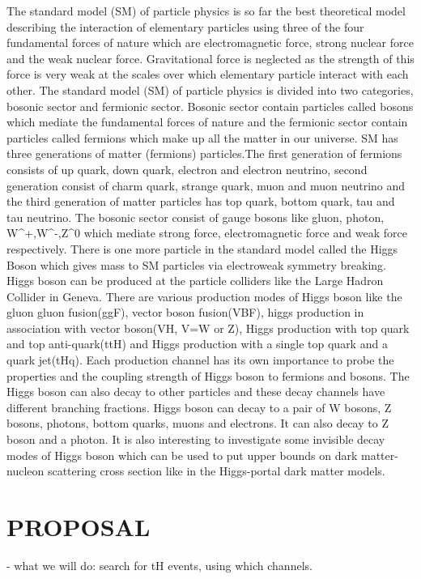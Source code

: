\documentclass[final,3p]{CSP}
\begin{document}
The standard model (SM) of particle physics is so far the best theoretical model describing the interaction of elementary particles using three of the four fundamental forces of nature which are electromagnetic force, strong nuclear force and the weak nuclear force. Gravitational force is neglected as the strength of this force is very weak at the scales over which elementary particle interact with each other. The standard model (SM) of particle physics is divided into two categories, bosonic sector and fermionic sector. Bosonic sector contain particles called bosons which mediate the fundamental forces of nature and the fermionic sector contain particles called fermions which make up all the matter in our universe. SM has three generations of matter (fermions) particles.The first generation of fermions consists of up quark, down quark, electron and electron neutrino, second generation consist of charm quark, strange quark, muon and muon neutrino and the third generation of matter particles has top quark, bottom quark, tau and tau neutrino. The bosonic sector consist of gauge bosons like gluon, photon, W^+,W^-,Z^0 which mediate strong force, electromagnetic force and weak force respectively. There is one more particle in the standard model called the Higgs Boson which gives mass to SM particles via electroweak symmetry breaking. Higgs boson can be produced at the particle colliders like the Large Hadron Collider in Geneva. There are various production modes of Higgs boson like the gluon gluon fusion(ggF), vector boson fusion(VBF), higgs production in association with vector boson(VH, V=W or Z), Higgs production with top quark and top anti-quark(ttH) and Higgs production with a single top quark and a quark jet(tHq). Each production channel has its own importance to probe the properties and the coupling strength of Higgs boson to fermions and bosons. The Higgs boson can also decay to other particles and these decay channels have different branching fractions. Higgs boson can decay to a pair of W bosons, Z bosons, photons, bottom quarks, muons and electrons. It can also decay to Z boson and a photon. It is also interesting to investigate some invisible decay modes of Higgs boson which can be used to put upper bounds on dark matter-nucleon scattering cross section like in the Higgs-portal dark matter models. 






\section{PROPOSAL}
- what we will do:  search for tH events, using which channels.
\end{document}
